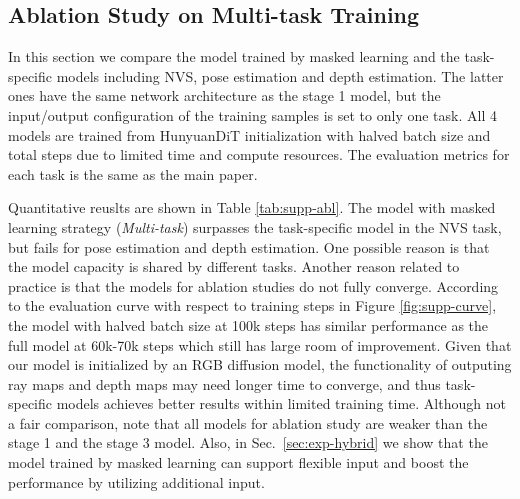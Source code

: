 \subsection{Ablation Study on Multi-task Training}\label{sec:supp-ablation}
In this section we compare the model trained by masked learning and the task-specific models including NVS, pose estimation and depth estimation. The latter ones have the same network architecture as the stage 1 model, but the input/output configuration of the training samples is set to only one task. All 4 models are trained from HunyuanDiT \cite{li2024hunyuan} initialization with halved batch size and total steps due to limited time and compute resources. The evaluation metrics for each task is the same as the main paper. 

Quantitative reuslts are shown in Table \ref{tab:supp-abl}. The model with masked learning strategy (\textit{Multi-task}) surpasses the task-specific model in the NVS task, but fails for pose estimation and depth estimation. One possible reason is that the model capacity is shared by different tasks. Another reason related to practice is that the models for ablation studies do not fully converge. According to the evaluation curve with respect to training steps in Figure \ref{fig:supp-curve}, the model with halved batch size at 100k steps has similar performance as the full model at 60k-70k steps which still has large room of improvement. Given that our model is initialized by an RGB diffusion model, the functionality of outputing ray maps and depth maps may need longer time to converge, and thus task-specific models achieves better results within limited training time. Although not a fair comparison, note that all models for ablation study are weaker than the stage 1 and the stage 3 model. Also, in Sec.~\ref{sec:exp-hybrid} we show that the model trained by masked learning can support flexible input and boost the performance by utilizing additional input. 


